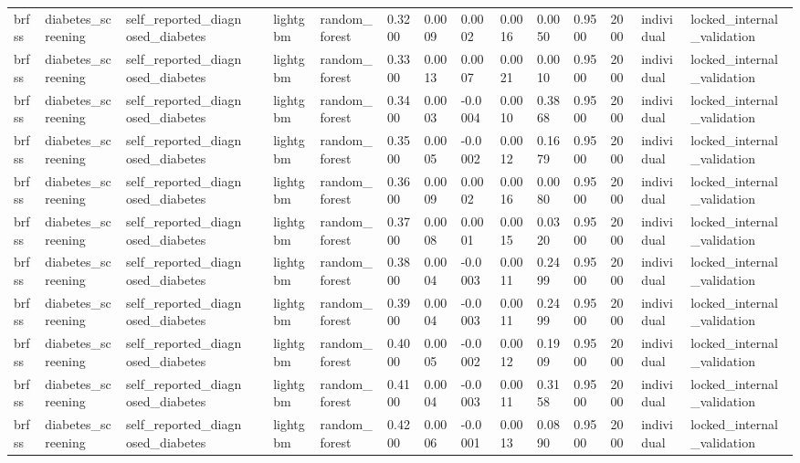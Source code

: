 \begin{tabular}{lllllllllllllll}
brfss & diabetes\_screening & self\_reported\_diagnosed\_diabetes &  & lightgbm & random\_forest & 0.3200 & 0.0009 & 0.0002 & 0.0016 & 0.0050 & 0.9500 & 2000 & individual & locked\_internal\_validation \\
brfss & diabetes\_screening & self\_reported\_diagnosed\_diabetes &  & lightgbm & random\_forest & 0.3300 & 0.0013 & 0.0007 & 0.0021 & 0.0010 & 0.9500 & 2000 & individual & locked\_internal\_validation \\
brfss & diabetes\_screening & self\_reported\_diagnosed\_diabetes &  & lightgbm & random\_forest & 0.3400 & 0.0003 & -0.0004 & 0.0010 & 0.3868 & 0.9500 & 2000 & individual & locked\_internal\_validation \\
brfss & diabetes\_screening & self\_reported\_diagnosed\_diabetes &  & lightgbm & random\_forest & 0.3500 & 0.0005 & -0.0002 & 0.0012 & 0.1679 & 0.9500 & 2000 & individual & locked\_internal\_validation \\
brfss & diabetes\_screening & self\_reported\_diagnosed\_diabetes &  & lightgbm & random\_forest & 0.3600 & 0.0009 & 0.0002 & 0.0016 & 0.0080 & 0.9500 & 2000 & individual & locked\_internal\_validation \\
brfss & diabetes\_screening & self\_reported\_diagnosed\_diabetes &  & lightgbm & random\_forest & 0.3700 & 0.0008 & 0.0001 & 0.0015 & 0.0320 & 0.9500 & 2000 & individual & locked\_internal\_validation \\
brfss & diabetes\_screening & self\_reported\_diagnosed\_diabetes &  & lightgbm & random\_forest & 0.3800 & 0.0004 & -0.0003 & 0.0011 & 0.2499 & 0.9500 & 2000 & individual & locked\_internal\_validation \\
brfss & diabetes\_screening & self\_reported\_diagnosed\_diabetes &  & lightgbm & random\_forest & 0.3900 & 0.0004 & -0.0003 & 0.0011 & 0.2499 & 0.9500 & 2000 & individual & locked\_internal\_validation \\
brfss & diabetes\_screening & self\_reported\_diagnosed\_diabetes &  & lightgbm & random\_forest & 0.4000 & 0.0005 & -0.0002 & 0.0012 & 0.1909 & 0.9500 & 2000 & individual & locked\_internal\_validation \\
brfss & diabetes\_screening & self\_reported\_diagnosed\_diabetes &  & lightgbm & random\_forest & 0.4100 & 0.0004 & -0.0003 & 0.0011 & 0.3158 & 0.9500 & 2000 & individual & locked\_internal\_validation \\
brfss & diabetes\_screening & self\_reported\_diagnosed\_diabetes &  & lightgbm & random\_forest & 0.4200 & 0.0006 & -0.0001 & 0.0013 & 0.0890 & 0.9500 & 2000 & individual & locked\_internal\_validation \\

\end{tabular}
